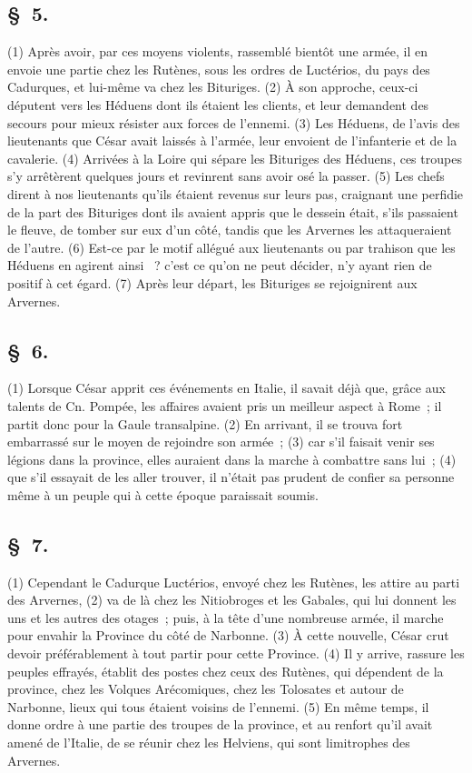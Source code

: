 \documentclass[french,twoside]{book} %
\begin{document}
\subsection[{§ 5.}]{ \textsc{§ 5.} }
\noindent (1) Après avoir, par ces moyens violents, rassemblé bientôt une armée, il en envoie une partie chez les Rutènes, sous les ordres de Luctérios, du pays des Cadurques, et lui-même va chez les Bituriges. (2) À son approche, ceux-ci députent vers les Héduens dont ils étaient les clients, et leur demandent des secours pour mieux résister aux forces de l’ennemi. (3) Les Héduens, de l’avis des lieutenants que César avait laissés à l’armée, leur envoient de l’infanterie et de la cavalerie. (4) Arrivées à la Loire qui sépare les Bituriges des Héduens, ces troupes s’y arrêtèrent quelques jours et revinrent sans avoir osé la passer. (5) Les chefs dirent à nos lieutenants qu’ils étaient revenus sur leurs pas, craignant une perfidie de la part des Bituriges dont ils avaient appris que le dessein était, s’ils passaient le fleuve, de tomber sur eux d’un côté, tandis que les Arvernes les attaqueraient de l’autre. (6) Est-ce par le motif allégué aux lieutenants ou par trahison que les Héduens en agirent ainsi  ? c’est ce qu’on ne peut décider, n’y ayant rien de positif à cet égard. (7) Après leur départ, les Bituriges se rejoignirent aux Arvernes.
\subsection[{§ 6.}]{ \textsc{§ 6.} }
\noindent (1) Lorsque César apprit ces événements en Italie, il savait déjà que, grâce aux talents de Cn. Pompée, les affaires avaient pris un meilleur aspect à Rome ; il partit donc pour la Gaule transalpine. (2) En arrivant, il se trouva fort embarrassé sur le moyen de rejoindre son armée ; (3) car s’il faisait venir ses légions dans la province, elles auraient dans la marche à combattre sans lui ; (4) que s’il essayait de les aller trouver, il n’était pas prudent de confier sa personne même à un peuple qui à cette époque paraissait soumis.
\subsection[{§ 7.}]{ \textsc{§ 7.} }
\noindent (1) Cependant le Cadurque Luctérios, envoyé chez les Rutènes, les attire au parti des Arvernes, (2) va de là chez les Nitiobroges et les Gabales, qui lui donnent les uns et les autres des otages ; puis, à la tête d’une nombreuse armée, il marche pour envahir la Province du côté de Narbonne. (3) À cette nouvelle, César crut devoir préférablement à tout partir pour cette Province. (4) Il y arrive, rassure les peuples effrayés, établit des postes chez ceux des Rutènes, qui dépendent de la province, chez les Volques Arécomiques, chez les Tolosates et autour de Narbonne, lieux qui tous étaient voisins de l’ennemi. (5) En même temps, il donne ordre à une partie des troupes de la province, et au renfort qu’il avait amené de l’Italie, de se réunir chez les Helviens, qui sont limitrophes des Arvernes.
\end{document}

